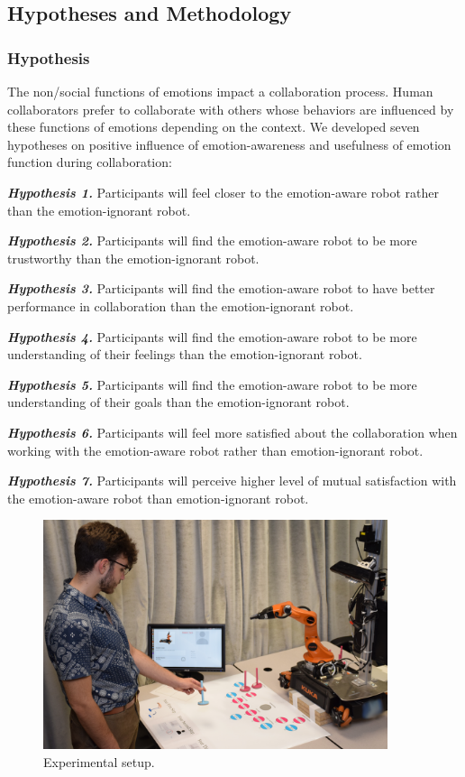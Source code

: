 \documentclass[12pt]{report}
\begin{document}
\subsection{Hypotheses and Methodology}

\subsubsection{Hypothesis}

The non/social functions of emotions impact a collaboration process. Human
collaborators prefer to collaborate with others whose behaviors are influenced
by these functions of emotions depending on the context. We developed seven
hypotheses on positive influence of emotion-awareness and usefulness of emotion
function during collaboration:

\textit{\textbf{Hypothesis 1.}} Participants will feel closer to the emotion-aware
robot rather than the emotion-ignorant robot.

\textit{\textbf{Hypothesis 2.}} Participants will find the emotion-aware robot to be
more trustworthy than the emotion-ignorant robot.

\textit{\textbf{Hypothesis 3.}} Participants will find the emotion-aware robot to
have better performance in collaboration than the emotion-ignorant robot.

\textit{\textbf{Hypothesis 4.}} Participants will find the emotion-aware robot to be
more understanding of their feelings than the emotion-ignorant robot.

\textit{\textbf{Hypothesis 5.}} Participants will find the emotion-aware robot to be
more understanding of their goals than the emotion-ignorant robot.

\textit{\textbf{Hypothesis 6.}} Participants will feel more satisfied about the
collaboration when working with the emotion-aware robot rather than
emotion-ignorant robot.

\textit{\textbf{Hypothesis 7.}} Participants will perceive higher level of mutual
satisfaction with the emotion-aware robot than emotion-ignorant robot.

\begin{figure}
  \centering
  \includegraphics[width=0.9\textwidth]{figure/environment.png}
  \caption{Experimental setup.}
  \label{fig:environment}
\end{figure}
\end{document}
